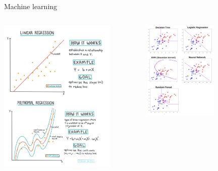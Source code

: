 \documentclass[11pt]{beamer}
\begin{document}
\begin{frame}{Machine learning \cite{pml1Book,pml2Book,classification,regression}}


\begin{columns}
\begin{column}{0.5\textwidth}
\begin{center}
\includegraphics[width=0.8\textwidth]{Pic/regression.png}
\end{center}
\end{column}
\begin{column}{0.4\textwidth}  
\begin{center}
\includegraphics[width=0.6\textwidth]{Pic/classification.png}

\end{center}
\end{column}
\end{columns}
\end{frame}
\end{document}
